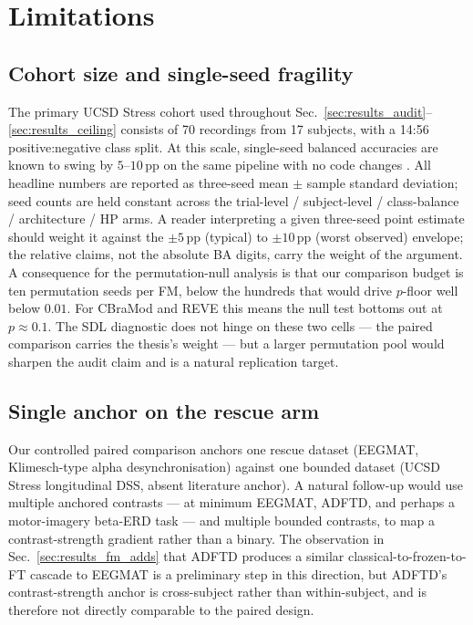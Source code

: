 \section{Limitations}
\label{sec:limitations}

\subsection{Cohort size and single-seed fragility}
The primary UCSD Stress cohort used throughout
Sec.~\ref{sec:results_audit}--\ref{sec:results_ceiling} consists of 70
recordings from 17 subjects, with a 14:56 positive:negative class
split. At this scale, single-seed balanced accuracies are known to
swing by $5$--$10$\,pp on the same pipeline with no code changes
\citep{smalln2025biorxiv}. All headline numbers are reported as
three-seed mean $\pm$ sample standard deviation; seed counts are
held constant across the trial-level / subject-level / class-balance
/ architecture / HP arms. A reader interpreting a given three-seed
point estimate should weight it against the $\pm 5$\,pp (typical) to
$\pm 10$\,pp (worst observed) envelope; the relative claims, not the
absolute BA digits, carry the weight of the argument. A consequence
for the permutation-null analysis is that our comparison budget is
ten permutation seeds per FM, below the hundreds that would drive
$p$-floor well below $0.01$. For CBraMod and REVE this means the
null test bottoms out at $p \approx 0.1$. The SDL diagnostic does not
hinge on these two cells --- the paired comparison carries the
thesis's weight --- but a larger permutation pool would sharpen the
audit claim and is a natural replication target.

\subsection{Single anchor on the rescue arm}
Our controlled paired comparison anchors one rescue dataset (EEGMAT,
Klimesch-type alpha desynchronisation) against one bounded dataset
(UCSD Stress longitudinal DSS, absent literature anchor). A natural
follow-up would use multiple anchored contrasts --- at minimum
EEGMAT, ADFTD, and perhaps a motor-imagery beta-ERD task --- and
multiple bounded contrasts, to map a contrast-strength gradient
rather than a binary. The observation in
Sec.~\ref{sec:results_fm_adds} that ADFTD produces a similar
classical-to-frozen-to-FT cascade to EEGMAT is a preliminary step in
this direction, but ADFTD's contrast-strength anchor is cross-subject
rather than within-subject, and is therefore not directly comparable
to the paired design.

